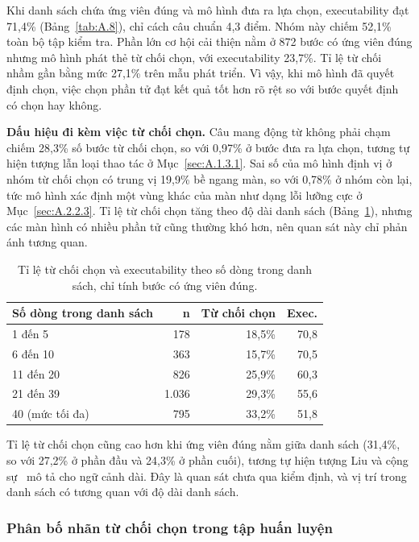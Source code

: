 Khi danh sách chứa ứng viên đúng và mô hình đưa ra lựa chọn, executability đạt 71,4\% (Bảng~\ref{tab:A.8}), chỉ cách câu chuẩn 4,3 điểm. Nhóm này chiếm 52,1\% toàn bộ tập kiểm tra. Phần lớn cơ hội cải thiện nằm ở 872 bước có ứng viên đúng nhưng mô hình phát thẻ từ chối chọn, với executability 23,7\%. Tỉ lệ từ chối nhầm gần bằng mức 27,1\% trên mẫu phát triển. Vì vậy, khi mô hình đã quyết định chọn, việc chọn phần tử đạt kết quả tốt hơn rõ rệt so với bước quyết định có chọn hay không.

\textbf{Dấu hiệu đi kèm việc từ chối chọn.} Câu mang động từ không phải chạm chiếm 28,3\% số bước từ chối chọn, so với 0,97\% ở bước đưa ra lựa chọn, tương tự hiện tượng lẫn loại thao tác ở Mục~\ref{sec:A.1.3.1}. Sai số của mô hình định vị ở nhóm từ chối chọn có trung vị 19,9\% bề ngang màn, so với 0,78\% ở nhóm còn lại, tức mô hình xác định một vùng khác của màn như dạng lỗi lưỡng cực ở Mục~\ref{sec:A.2.2.3}. Tỉ lệ từ chối chọn tăng theo độ dài danh sách (Bảng~\ref{tab:A.9}), nhưng các màn hình có nhiều phần tử cũng thường khó hơn, nên quan sát này chỉ phản ánh tương quan.

\begin{table}[htbp]
\centering\small
\caption[Tỉ lệ từ chối chọn và executability theo số dòng trong danh sách, chỉ tính bước có ứng viên đúng.]{Tỉ lệ từ chối chọn và executability theo số dòng trong danh sách, chỉ tính bước có ứng viên đúng.}\label{tab:A.9}
\begin{tabular}{@{}lrrr@{}}
\toprule
\textbf{Số dòng trong danh sách} & \textbf{n} & \textbf{Từ chối chọn} & \textbf{Exec.} \\
\midrule
1 đến 5 & 178 & 18,5\% & 70,8 \\
6 đến 10 & 363 & 15,7\% & 70,5 \\
11 đến 20 & 826 & 25,9\% & 60,3 \\
21 đến 39 & 1.036 & 29,3\% & 55,6 \\
40 (mức tối đa) & 795 & 33,2\% & 51,8 \\
\bottomrule
\end{tabular}
\end{table}

Tỉ lệ từ chối chọn cũng cao hơn khi ứng viên đúng nằm giữa danh sách (31,4\%, so với 27,2\% ở phần đầu và 24,3\% ở phần cuối), tương tự hiện tượng Liu và cộng sự~\cite{liu2024lost} mô tả cho ngữ cảnh dài. Đây là quan sát chưa qua kiểm định, và vị trí trong danh sách có tương quan với độ dài danh sách.

\subsubsection{Phân bố nhãn từ chối chọn trong tập huấn luyện}\label{sec:A.3.2.3}

